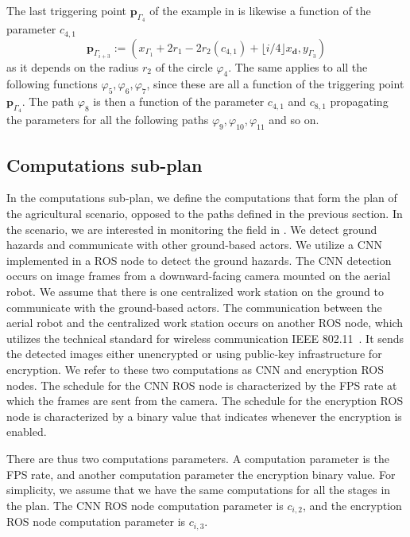 The last triggering point $\mathbf{p}_{\Gamma_4}$ of the example in  is likewise a function of the parameter $c_{4,1}$
\begin{equation}
  \mathbf{p}_{\Gamma_{i+3}}:=(x_{\Gamma_1}+2r_1-2r_2(c_{4,1})+\lfloor i/4\rfloor x_\mathbf{d},y_{\Gamma_3})
\end{equation}
as it depends on the radius $r_2$ of the circle $\varphi_4$. The same applies to all the following functions $\varphi_5,\varphi_6,\varphi_7$, since these are all a function of the triggering point $\mathbf{p}_{\Gamma_4}$. The path $\varphi_8$ is then a function of the parameter $c_{4,1}$ and $c_{8,1}$ propagating the parameters for all the following paths $\varphi_9,\varphi_{10},\varphi_{11}$ and so on.

\subsection{Computations sub-plan}
\label{sec:computation-wise}

In the computations sub-plan, we define the computations that form the plan of the agricultural scenario, opposed to the paths defined in the previous section. In the scenario, we are interested in monitoring the field in . We detect ground hazards and communicate with other ground-based actors. We utilize a CNN implemented in a ROS node to detect the ground hazards. The CNN detection occurs on image frames from a downward-facing camera mounted on the aerial robot. We assume that there is one centralized work station on the ground to communicate with the ground-based actors. The communication between the aerial robot and the centralized work station occurs on another ROS node, which utilizes the technical standard for wireless communication IEEE 802.11~\citep{crow1997ieee}. It sends the detected images either unencrypted or using public-key infrastructure for encryption. We refer to these two computations as CNN and encryption ROS nodes. The schedule for the CNN ROS node is characterized by the FPS rate at which the frames are sent from the camera. The schedule for the encryption ROS node is characterized by a binary value that indicates whenever the encryption is enabled.

There are thus two computations parameters. A computation parameter is the FPS rate, and another computation parameter the encryption binary value. For simplicity, we assume that we have the same computations for all the stages in the plan. The CNN ROS node computation parameter is $c_{i,2}$, and the encryption ROS node computation parameter is $c_{i,3}$.

